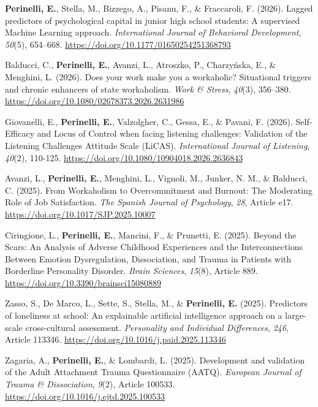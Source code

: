 \documentclass[hidelinks, letterpaper,10pt]{article} %
\begin{document}
\begin{etaremune}
\item \textbf{Perinelli, E.}, Stella, M., Bizzego, A., Pisanu, F., \& Fraccaroli, F. (2026). Lagged predictors of psychological capital in junior high school students: A supervised Machine Learning approach. \textit{International Journal of Behavioral Development}, \textit{50}(5), 654–668. \url{https://doi.org/10.1177/01650254251368793}

\item Balducci, C., \textbf{Perinelli, E.}, Avanzi, L., Atroszko, P., Charzyńska, E., \& Menghini, L. (2026). Does your work make you a workaholic? Situational triggers and chronic enhancers of state workaholism. \textit{Work \& Stress}, \textit{40}(3), 356–380. \url{https://doi.org/10.1080/02678373.2026.2631986}

\item Giovanelli, E., \textbf{Perinelli, E.}, Valzolgher, C., Gessa, E., \& Pavani, F. (2026). Self-Efficacy and Locus of Control when facing listening challenges: Validation of the Listening Challenges Attitude Scale (LiCAS). \textit{International Journal of Listening}, \textit{40}(2), 110-125. \url{https://doi.org/10.1080/10904018.2026.2636843}

\item Avanzi, L., \textbf{Perinelli, E.}, Menghini, L., Vignoli, M., Junker, N. M., \& Balducci, C. (2025). From Workaholism to Overcommitment and Burnout: The Moderating Role of Job Satisfaction. \textit{The Spanish Journal of Psychology}, \textit{28}, Article e17. \url{https://doi.org/10.1017/SJP.2025.10007}

\item Ciringione, L., \textbf{Perinelli, E.}, Mancini, F., \& Prunetti, E. (2025). Beyond the Scars: An Analysis of Adverse Childhood Experiences and the Interconnections Between Emotion Dysregulation, Dissociation, and Trauma in Patients with Borderline Personality Disorder. \textit{Brain Sciences}, \textit{15}(8), Article 889. \url{https://doi.org/10.3390/brainsci15080889}

\item Zasso, S., De Marco, L., Sette, S., Stella, M., \& \textbf{Perinelli, E.} (2025). Predictors of loneliness at school: An explainable artificial intelligence approach on a large-scale cross-cultural assessment. \textit{Personality and Individual Differences}, \textit{246}, Article 113346. \url{https://doi.org/10.1016/j.paid.2025.113346}

\item Zagaria, A., \textbf{Perinelli, E.}, \& Lombardi, L. (2025). Development and validation of the Adult Attachment Trauma Questionnaire (AATQ). \textit{European Journal of Trauma \& Dissociation}, \textit{9}(2), Article 100533. \url{https://doi.org/10.1016/j.ejtd.2025.100533}


\end{etaremune}
\end{document}
